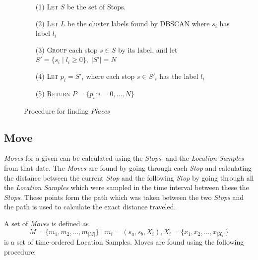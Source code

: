 \begin{figure}[h]
    \centering
    \begin{center}
    \begin{itemize}
    \item[(1)] \textsc{Let} $S$ be the set of Stops.
    \item[(2)] \textsc{Let} $L$ be the cluster labels found by  DBSCAN where $s_i$ has label $l_i$ 
    \item[(3)] \textsc{Group} each stop $s \in S$ by its label, and let $S' = \{s_i \;|\; l_i \geq 0\}, \;|S'| = N$
    \item[(4)] \textsc{Let} $p_i = S'_i$ where each stop $s \in S'_i$ has the label $l_i$
    \item[(5)] \textsc{Return} $P = \{p_i : i = 0, ..., N\}$
\end{itemize} 
\end{center}
    \caption{Procedure for finding \textit{Places}}
    \label{fig:find_places}
\end{figure}

\subsection{Move}
\textit{Moves} for a given can be calculated using the \textit{Stops}- and the \textit{Location Samples} from that date. The \textit{Moves} are found by going through each \textit{Stop} and calculating the distance between the current \textit{Stop} and the following \textit{Stop} by going through all the \textit{Location Samples} which were sampled in the time interval between these the \textit{Stops}. These points form the path which was taken between the two \textit{Stops} and the path is used to calculate the exact distance traveled.

A set of \textit{Moves} is defined as 
$$M = \{m_1, m_2, ..., m_{|M|}\} \;| \; m_i = (s_a, s_b, X_i), X_i = \{x_1, x_2, ..., x_{|X_i|}\}$$ 
is a set of time-ordered Location Samples. Moves are found using the following procedure:

